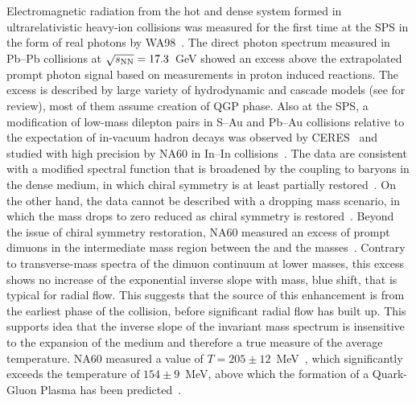 \documentclass[../report.tex]{subfiles}
\begin{document}
Electromagnetic radiation from the hot and dense system formed in ultrarelativistic heavy-ion collisions was measured for the first time at the SPS in the form of real photons by WA98~\cite{Aggarwal:2000th}. The direct photon spectrum measured in Pb--Pb collisions at $\sqrt{s_{\rm NN}} = 17.3$~GeV showed an excess above the extrapolated prompt photon signal based on measurements in proton induced reactions. 
The excess is described by large variety of hydrodynamic and cascade models (see \cite{Peitzmann:2001mz} for review), most of them assume creation of QGP phase.
Also at the SPS, a modification of low-mass dilepton pairs in S--Au and Pb--Au collisions relative to the expectation of in-vacuum hadron decays was observed by CERES~\cite{Agakishiev:1995xb,Agakishiev:1997au,Adamova:2002kf,Agakichiev:2005ai,Adamova:2006nu} and studied with high precision by NA60 in In--In collisions~\cite{Arnaldi:2006jq,Arnaldi:2007ru,Arnaldi:2008fw,Specht:2010xu}. The data are consistent with a modified \Prho spectral function that is broadened by the coupling to baryons in the dense medium, in which chiral symmetry is at least partially restored~\cite{Rapp:1995zy,Rapp:1999us,Rapp:2009yu,Bazavov:2011nk,Hohler:2013eba}. On the other hand, the data cannot be described with a dropping mass scenario, in which the \Prho mass drops to zero reduced as chiral symmetry is restored~\cite{Brown:1991kk}. Beyond the issue of chiral symmetry restoration, NA60 measured an excess of prompt dimuons in the intermediate mass region between the \Pphi and the \PJpsi masses~\cite{Arnaldi:2007ru,Arnaldi:2008fw}. Contrary to transverse-mass spectra of the dimuon continuum at lower masses, this excess shows no increase of the exponential inverse slope with mass, \ie blue shift, that is typical for radial flow. This suggests that the source of this enhancement is from the earliest phase of the collision, before significant radial flow has built up. 
This supports idea that the inverse slope of the invariant mass spectrum is insensitive to the expansion of the medium and therefore a true measure of the average temperature. NA60 measured a value of $T=205\pm12$~MeV~\cite{Specht:2010xu}, which significantly exceeds the temperature of $154\pm9$~MeV, above which the formation of a Quark-Gluon Plasma has been predicted~\cite{Borsanyi:2010bp,Bazavov:2014pvz}.
\end{document}
